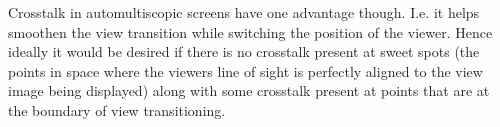 Crosstalk in automultiscopic screens have one advantage though. I.e. it helps smoothen the view transition while switching the position of the viewer. Hence ideally it would be desired if there is no crosstalk present at sweet spots (the points in space where the viewers line of sight is perfectly aligned to the view image being displayed) along with some crosstalk present at points that are at the boundary of view transitioning.












